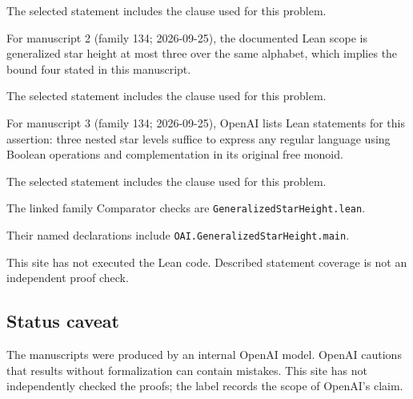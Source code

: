 \documentclass[11pt]{article}
\begin{document}
The selected statement includes the clause used for this problem.

For manuscript 2 (family 134; 2026-09-25), the documented Lean scope is generalized star height at most three over the same alphabet, which implies the bound four stated in this manuscript.

The selected statement includes the clause used for this problem.

For manuscript 3 (family 134; 2026-09-25), OpenAI lists Lean statements for this assertion: three nested star levels suffice to express any regular language using Boolean operations and complementation in its original free monoid.

The selected statement includes the clause used for this problem.

The linked family Comparator checks are \texttt{GeneralizedStarHeight.lean}.

Their named declarations include \texttt{OAI.GeneralizedStarHeight.main}.

This site has not executed the Lean code. Described statement coverage is not an independent proof check.

\subsection{Status caveat}
The manuscripts were produced by an internal OpenAI model. OpenAI cautions that results without formalization can contain mistakes. This site has not independently checked the proofs; the label records the scope of OpenAI's claim.
\end{document}
